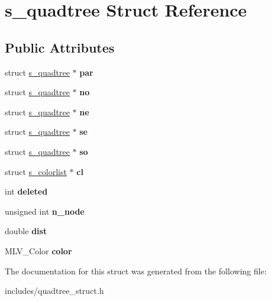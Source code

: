 \hypertarget{structs__quadtree}{}\section{s\+\_\+quadtree Struct Reference}
\label{structs__quadtree}
\subsection*{Public Attributes}
\begin{DoxyCompactItemize}
\item 
\mbox{\label{structs__quadtree_ae2a75dfe01279885c8ad45d63e31f7b6}} 
struct \hyperlink{structs__quadtree}{s\+\_\+quadtree} $\ast$ {\bfseries par}
\item 
\mbox{\label{structs__quadtree_a4ff66080a3252a95ac7118f7e45c970a}} 
struct \hyperlink{structs__quadtree}{s\+\_\+quadtree} $\ast$ {\bfseries no}
\item 
\mbox{\label{structs__quadtree_ac20e248b0d03751cc760a8bc6c411e1a}} 
struct \hyperlink{structs__quadtree}{s\+\_\+quadtree} $\ast$ {\bfseries ne}
\item 
\mbox{\label{structs__quadtree_a0f22312ce50e648b3b37637555bedb54}} 
struct \hyperlink{structs__quadtree}{s\+\_\+quadtree} $\ast$ {\bfseries se}
\item 
\mbox{\label{structs__quadtree_a3e725e6ac43d9e76b92445567713673d}} 
struct \hyperlink{structs__quadtree}{s\+\_\+quadtree} $\ast$ {\bfseries so}
\item 
\mbox{\label{structs__quadtree_a0796fd375e435d4f79be96757fdbece9}} 
struct \hyperlink{structs__colorlist}{s\+\_\+colorlist} $\ast$ {\bfseries cl}
\item 
\mbox{\label{structs__quadtree_a14bb8d305363cc1465abf51954d2c74c}} 
int {\bfseries deleted}
\item 
\mbox{\label{structs__quadtree_af69cdede69bdc917b83bb184e2989f3e}} 
unsigned int {\bfseries n\+\_\+node}
\item 
\mbox{\label{structs__quadtree_ae8f8d756d8c9018bbd1500697276089d}} 
double {\bfseries dist}
\item 
\mbox{\label{structs__quadtree_a7ba4eb7b636d56072c65fc6d87948bf4}} 
M\+L\+V\+\_\+\+Color {\bfseries color}
\end{DoxyCompactItemize}


The documentation for this struct was generated from the following file\+:\begin{DoxyCompactItemize}
\item 
includes/quadtree\+\_\+struct.\+h\end{DoxyCompactItemize}
